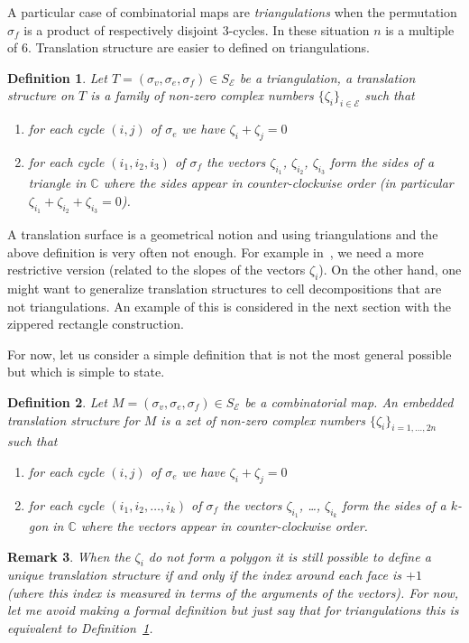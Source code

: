 \documentclass{article}
\def\cE{\mathcal{E}}
\def\CC{\mathbb{C}}
\newtheorem{definition}{Definition}
\newtheorem{remark}[definition]{Remark}
\begin{document}
A particular case of combinatorial maps are \emph{triangulations}
when the permutation $\sigma_f$ is a product of respectively disjoint 3-cycles.
In these situation $n$ is a multiple of $6$. Translation structure are
easier to defined on triangulations.
\begin{definition}
\label{def:FlatTriangulation}
Let $T = (\sigma_v, \sigma_e, \sigma_f) \in S_\cE$ be a 
triangulation, a \emph{translation structure} on $T$
is a family of non-zero complex numbers $\{\zeta_i\}_{i\in\cE}$
such that
\begin{enumerate}
\item for each cycle $(i,j)$ of $\sigma_e$ we have $\zeta_i + \zeta_j = 0$
\item for each cycle $(i_1,i_2,i_3)$ of $\sigma_f$ 
the vectors $\zeta_{i_1}$, $\zeta_{i_2}$, $\zeta_{i_3}$ form the
sides of a triangle in $\CC$ where the sides appear in counter-clockwise order
(in particular $\zeta_{i_1} + \zeta_{i_2} + \zeta_{i_3} = 0$).
\end{enumerate}
\end{definition}
A translation surface is a geometrical notion and using triangulations
and the above definition is very often not enough.
For example in~\cite{veerer}, we need a more restrictive version
(related to the slopes of the vectors $\zeta_i$).
On the other hand, one might want to generalize translation structures
to cell decompositions that are not triangulations. An example of
this is considered in the next section with the zippered rectangle
construction.

For now, let us consider a simple definition that is not the most
general possible but which is simple to state.
\begin{definition}
\label{def:EmbeddedTranslationStructure}
Let $M = (\sigma_v, \sigma_e, \sigma_f) \in S_\cE$ be a combinatorial
map. An \emph{embedded translation structure} for $M$ is a zet of non-zero
complex numbers $\{\zeta_i\}_{i=1,\ldots,2n}$ such that
\begin{enumerate}
\item for each cycle $(i,j)$ of $\sigma_e$ we have
$\zeta_i + \zeta_j = 0$
\item for each cycle $(i_1,i_2,\ldots,i_k)$ of $\sigma_f$ the vectors
$\zeta_{i_1}$, \ldots, $\zeta_{i_k}$ form the sides of a $k$-gon in
$\CC$ where the vectors appear in counter-clockwise order.
\end{enumerate}
\end{definition}

\begin{remark}
When the $\zeta_i$ do not form a polygon it is still
possible to define a unique translation structure if and
only if the index around each face is $+1$ (where this index is measured in terms
of the arguments of the vectors). For now, let me avoid making
a formal definition but just say that for triangulations
this is equivalent to Definition~\ref{def:FlatTriangulation}.
\end{remark}
\end{document}
